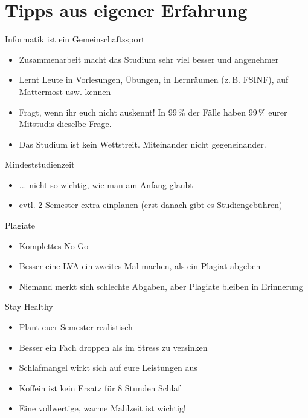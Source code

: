 \documentclass{beamer}
\begin{document}
\section{Tipps aus eigener Erfahrung}

\begin{frame}{Informatik ist ein Gemeinschaftssport}
    \begin{itemize}
        \item Zusammenarbeit macht das Studium sehr viel besser und angenehmer
        \item Lernt Leute in Vorlesungen, Übungen, in Lernräumen (z.\,B. FSINF), auf
            Mattermost usw. kennen
        \item Fragt, wenn ihr euch nicht auskennt! In 99\,\% der Fälle haben 99\,\%
            eurer Mitstudis dieselbe Frage.
        \item Das Studium ist kein Wettstreit. Miteinander nicht gegeneinander.
    \end{itemize}
\end{frame}

\begin{frame}{Mindeststudienzeit}
    \begin{itemize}
        \item ... nicht so wichtig, wie man am Anfang glaubt
        \item evtl. 2 Semester extra einplanen (erst danach gibt es Studiengebühren)
    \end{itemize}
\end{frame}

\begin{frame}{Plagiate}
    \begin{itemize}
        \item Komplettes No-Go
        \item Besser eine LVA ein zweites Mal machen, als ein Plagiat abgeben
        \item Niemand merkt sich schlechte Abgaben, aber Plagiate bleiben in Erinnerung
    \end{itemize}
\end{frame}

\begin{frame}{Stay Healthy}
    \begin{itemize}
        \item Plant euer Semester realistisch
        \item Besser ein Fach droppen als im Stress zu versinken
        \item Schlafmangel wirkt sich auf eure Leistungen aus
        \item Koffein ist kein Ersatz für 8 Stunden Schlaf
        \item Eine vollwertige, warme Mahlzeit ist wichtig!
    \end{itemize}
\end{frame}
\end{document}
